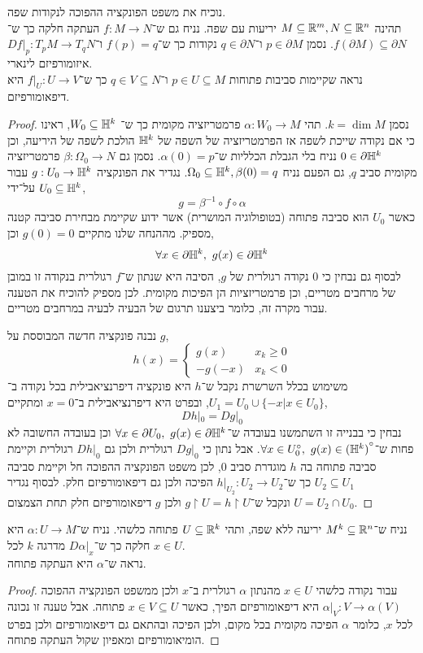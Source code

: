 \question{}
\subquestion{}
נוכיח את משפט הפונקציה ההפוכה לנקודות שפה. \\
תהינה $M \subseteq \mathbb{R}^m, N \subseteq \mathbb{R}^n$ יריעות עם שפה.
נניח גם ש־$f : M \to N$ העתקה חלקה כך ש־$f(\partial M) \subseteq \partial N$.
נסמן $p \in \partial M$ ו־$q \in \partial N$ נקודות כך ש־$f(p) = q$ ו־$D f |_p : T_p M \to T_q N$ איזומורפיזם לינארי. \\
נראה שקיימות סביבות פתוחות $p \in U \subseteq M$ ו־$q \in V \subseteq N$ כך ש־$f |_U : U \to V$ היא דיפאומורפיזם.
\begin{proof}
	נסמן $k = \dim M$.
	תהי $\alpha : W_0 \to M$ פרמטריזציה מקומית כך ש־ $W_0 \subseteq \mathbb{H}^k$, ראינו כי אם נקודה שייכת לשפה אז הפרמטריזציה של השפה של $\mathbb{H}^k$ הולכת לשפה של היריעה, וכן $0 \in \partial \mathbb{H}^k$ נניח בלי הגבלת הכלליות ש־$\alpha(0) = p$.
	נסמן גם $\beta : \Omega_0 \to N$ פרמטריזציה מקומית סביב $q$, גם הפעם נניח $\Omega_0 \subseteq \mathbb{H}^k, \beta(0) = q$.
	נגדיר את הפונקציה $g : U_0 \to \mathbb{H}^k$ עבור $U_0 \subseteq \mathbb{H}^k$ על־ידי,
	\[
		g = \beta^{-1} \circ f \circ \alpha
	\]
	כאשר $U_0$ הוא סביבה פתוחה (בטופולוגיה המושרית) אשר ידוע שקיימת מבחירת סביבה קטנה מספיק.
	מההנחה שלנו מתקיים $g(0) = 0$ וכן,
	\[
		\forall x \in \partial \HH^k,\ 
		g(x) \in \partial \HH^k
	\]
	לבסוף גם נבחין כי $0$ נקודה רגולרית של $g$, הסיבה היא שנתון ש־$f$ רגולרית בנקודה זו במובן של מרחבים מטריים, וכן פרמטריזציות הן הפיכות מקומית.
	לכן מספיק להוכיח את הטענה עבור מקרה זה, כלומר ביצענו תרגום של הבעיה לבעיה במרחבים מטריים.

	נבנה פונקציה חדשה המבוססת על $g$,
	\[
		h(x)
		= \begin{cases}
			g(x) & x_k \ge 0 \\
			- g(-x) & x_k < 0
		\end{cases}
	\]
	משימוש בכלל השרשרת נקבל ש־$h$ היא פונקציה דיפרנציאבילית בכל נקודה ב־$U_1 = U_0 \cup \{ -x | x \in U_0 \}$, ובפרט היא דיפרנציאבילית ב־$x = 0$ ומתקיים,
	\[
		D h |_0
		= D g |_0
	\]
	נבחין כי בבנייה זו השתמשנו בעובדה ש־$\forall x \in \partial U_0,\ g(x) \in \partial \HH^k$ וכן בעובדה החשובה לא פחות ש־$\forall x \in U_0^\circ,\ g(x) \in {(\mathbb{H}^k)}^\circ$.
	אבל נתון כי $D g |_0$ רגולרית ולכן גם $D h |_0$ רגולרית וקיימת סביבה פתוחה בה $h$ מוגדרת סביב $0$, לכן משפט הפונקציה ההפוכה חל וקיימת סביבה $U_2 \subseteq U_1$ כך ש־$h |_{U_2} : U_2 \to U_2$ הפיכה ולכן גם דיפאומורפיזם חלק.
	לבסוף נגדיר $U = U_2 \cap U_0$ ונקבל ש־$g \restriction U = h \restriction U$ ולכן $g$ דיפאומורפיזם חלק תחת הצמצום.
\end{proof}

\subquestion{}
נניח ש־$M^k \subseteq \mathbb{R}^n$ יריעה ללא שפה,
ותהי $U \subseteq \mathbb{R}^k$ פתוחה כלשהי.
נניח ש־$\alpha : U \to M$ היא חלקה כך ש־$D \alpha |_x$ מדרגה $k$ לכל $x \in U$. \\
נראה ש־$\alpha$ היא העתקה פתוחה.
\begin{proof}
	עבור נקודה כלשהי $x \in U$ מהנתון $\alpha$ רגולרית ב־$x$ ולכן ממשפט הפונקציה ההפוכה $\alpha |_V : V \to \alpha(V)$ היא דיפאומורפיזם הפיך, כאשר $x \in V \subseteq U$ פתוחה.
	אבל טענה זו נכונה לכל $x$, כלומר $\alpha$ הפיכה מקומית בכל מקום, ולכן הפיכה ובהתאם גם דיפאומורפיזם ולכן בפרט הומיאומורפיזם ומאפיון שקול העתקה פתוחה.
\end{proof}

